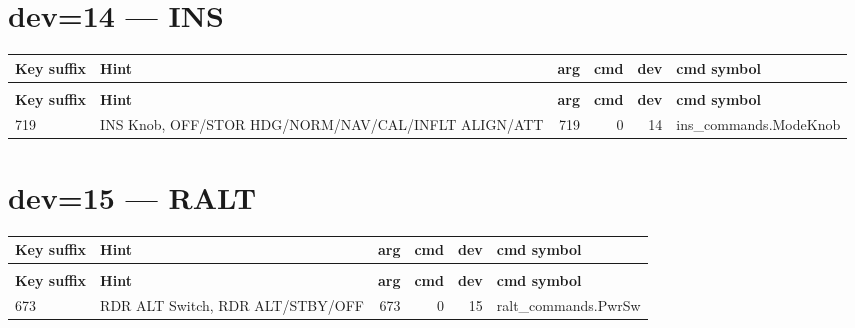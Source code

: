 \documentclass[10pt,a4paper]{article}
\begin{document}
\section{dev=14 — INS}
\begin{longtable}{>{\ttfamily\small}p{38mm} >{\small}p{72mm} r r r >{\ttfamily\small}p{48mm}}
\toprule
\textbf{Key suffix} & \textbf{Hint} & \textbf{arg} & \textbf{cmd} & \textbf{dev} & \textbf{cmd symbol} \\
\midrule
\endfirsthead
\multicolumn{6}{l}{\small\itshape continued\ldots}\\
\toprule
\textbf{Key suffix} & \textbf{Hint} & \textbf{arg} & \textbf{cmd} & \textbf{dev} & \textbf{cmd symbol} \\
\midrule
\endhead
\bottomrule
\endfoot
\rowcolor{rowodd}
  719 & INS Knob, OFF/STOR HDG/NORM/NAV/CAL/INFLT ALIGN/ATT & 719 & 0 & 14 & ins\_commands.ModeKnob \\
\end{longtable}
\section{dev=15 — RALT}
\begin{longtable}{>{\ttfamily\small}p{38mm} >{\small}p{72mm} r r r >{\ttfamily\small}p{48mm}}
\toprule
\textbf{Key suffix} & \textbf{Hint} & \textbf{arg} & \textbf{cmd} & \textbf{dev} & \textbf{cmd symbol} \\
\midrule
\endfirsthead
\multicolumn{6}{l}{\small\itshape continued\ldots}\\
\toprule
\textbf{Key suffix} & \textbf{Hint} & \textbf{arg} & \textbf{cmd} & \textbf{dev} & \textbf{cmd symbol} \\
\midrule
\endhead
\bottomrule
\endfoot
\rowcolor{rowodd}
  673 & RDR ALT Switch, RDR ALT/STBY/OFF & 673 & 0 & 15 & ralt\_commands.PwrSw \\
\end{longtable}
\end{document}
